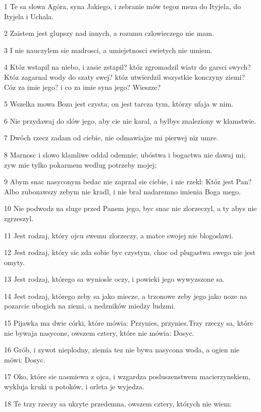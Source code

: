 \par 1 Te sa slowa Agóra, syna Jakiego, i zebranie mów tegoz meza do Ityjela, do Ityjela i Uchala.
\par 2 Zaistem jest glupszy nad innych, a rozumu czlowieczego nie mam.
\par 3 I nie nauczylem sie madrosci, a umiejetnosci swietych nie umiem.
\par 4 Któz wstapil na niebo, i zasie zstapil? któz zgromadzil wiatr do garsci swych? Któz zagarnal wody do szaty swej? któz utwierdzil wszystkie konczyny ziemi? Cóz za imie jego? i co za imie syna jego? Wieszze?
\par 5 Wszelka mowa Boza jest czysta; on jest tarcza tym, którzy ufaja w nim.
\par 6 Nie przydawaj do slów jego, aby cie nie karal, a bylbys znaleziony w klamstwie.
\par 7 Dwóch rzecz zadam od ciebie, nie odmawiajze mi pierwej niz umre.
\par 8 Marnosc i slowo klamliwe oddal odemnie; ubóstwa i bogactwa nie dawaj mi; zyw mie tylko pokarmem wedlug potrzeby mojej;
\par 9 Abym snac nasyconym bedac nie zaprzal sie ciebie, i nie rzekl: Któz jest Pan? Albo zubozawszy zebym nie kradl, i nie bral nadaremno imienia Boga mego.
\par 10 Nie podwodz na sluge przed Panem jego, byc snac nie zlorzeczyl, a ty abys nie zgrzeszyl.
\par 11 Jest rodzaj, który ojcu swemu zlorzeczy, a matce swojej nie blogoslawi.
\par 12 Jest rodzaj, który sie zda sobie byc czystym, choc od plugastwa swego nie jest omyty.
\par 13 Jest rodzaj, którego sa wyniosle oczy, i powieki jego wywyzszone sa.
\par 14 Jest rodzaj, którego zeby sa jako miecze, a trzonowe zeby jego jako noze na pozarcie ubogich na ziemi, a nedzników miedzy ludzmi.
\par 15 Pijawka ma dwie córki, które mówia: Przynies, przynies.Trzy rzeczy sa, które nie bywaja nasycone, owszem cztery, które nie mówia: Dosyc.
\par 16 Grób, i zywot nieplodny, ziemia tez nie bywa nasycona woda, a ogien nie mówi: Dosyc.
\par 17 Oko, które sie nasmiewa z ojca, i wzgardza posluszenstwem macierzynskiem, wykluja kruki u potoków, i orleta je wyjedza.
\par 18 Te trzy rzeczy sa ukryte przedemna, owszem cztery, których nie wiem:
